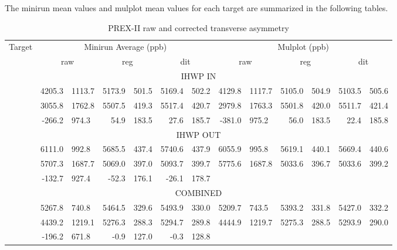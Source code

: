 The minirun mean values and mulplot mean values for each target are summarized in the following
tables.
\begin{table}[!h]
    \scriptsize
    \begin{tabular}{c | r@{ $\pm$ }l r@{ $\pm$ }l r@{ $\pm$ }l | r@{ $\pm$ }l r@{ $\pm$ }l r@{ $\pm$ }l}
	\hline
	\multirow{2}{*}{Target}	& \multicolumn{6}{c|}{Minirun Average (ppb)} & \multicolumn{6}{c}{Mulplot (ppb)}	\\
	\cline{2-13}
	    & \multicolumn{2}{c}{raw}   & \multicolumn{2}{c}{reg}	& \multicolumn{2}{c|}{dit}   & \multicolumn{2}{c}{raw}	& \multicolumn{2}{c}{reg}   & \multicolumn{2}{c}{dit}	\\
	\hline
	\multicolumn{13}{c}{IHWP IN}   \\
	\hline
	\Carbon	& 4205.3	& 1113.7    & 5173.9	& 501.5	    & 5169.4	& 502.2	    & 4129.8  & 1117.7    & 5105.0  & 504.9     & 5103.5  & 505.6   \\ 
	\ca	& 3055.8	& 1762.8    & 5507.5	& 419.3     & 5517.4	& 420.7	    & 2979.8  & 1763.3    & 5501.8  & 420.0     & 5511.7  & 421.4   \\   
	\Pb	& -266.2	& 974.3     & 54.9  	& 183.5     & 27.6  	& 185.7	    & -381.0  & 975.2     & 56.0   & 183.5	& 22.4    & 185.8   \\   
	\hline
	\multicolumn{13}{c}{IHWP OUT}   \\
	\hline
	\Carbon	& 6111.0	& 992.8	    & 5685.5	& 437.4	    & 5740.6	& 437.9	    & 6055.9  & 995.8     & 5619.1  & 440.1     & 5669.4  & 440.6   \\ 
	\ca	& 5707.3	& 1687.7    & 5069.0	& 397.0     & 5093.7	& 399.7	    & 5775.6  & 1687.8    & 5033.6  & 396.7     & 5033.6  & 399.2   \\   
	\Pb	& -132.7	& 927.4     & -52.3 	& 176.1     & -26.1 	& 178.7	    & \multicolumn{6}{c}{\color{red}{data cannot be reproduced due to lost of run 4112}}	\\   
	\hline
	\multicolumn{13}{c}{COMBINED}   \\
	\hline
	\Carbon	& 5267.8	& 740.8	    & 5464.5	& 329.6	    & 5493.9	& 330.0	    & 5209.7  & 743.5     & 5393.2  & 331.8     & 5427.0  & 332.2   \\ 
	\ca	& 4439.2	& 1219.1    & 5276.3	& 288.3     & 5294.7	& 289.8	    & 4444.9  & 1219.7    & 5275.3  & 288.5     & 5293.9  & 290.0   \\   
	\Pb	& -196.2	& 671.8     & -0.9  	& 127.0     & -0.3  	& 128.8	    & \multicolumn{6}{c}{\color{red}{data cannot be reproduced due to lost of run 4112}}  \\   
	\hline
    \end{tabular}
    \caption{PREX-II raw and corrected transverse asymmetry}
\end{table}

